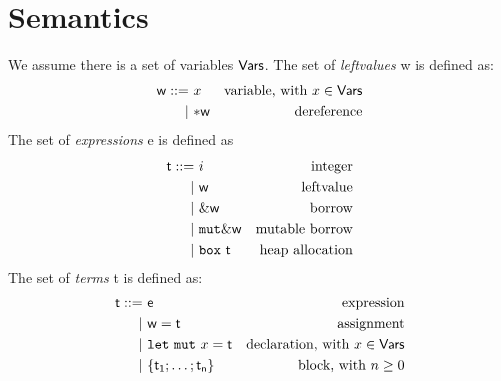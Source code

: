 \section{Semantics}\label{sec:semantics}

\begin{definition}
  We assume there is a set of variables $\mathsf{Vars}$.
  The set of \emph{leftvalues} \textsf{w} is defined as:
  \begin{align*}
    \mathsf{w} ::= &\ x & \text{variable, with $x\in\mathsf{Vars}$}\\
    | &\ \mathtt{*}\mathsf{w} & \text{dereference}
  \end{align*}
  The set of \emph{expressions} \textsf{e} is defined as
  \begin{align*}
    \mathsf{t} ::= &\ i & \text{integer}\\
    | &\ \mathsf{w} & \text{leftvalue}\\
    | &\ \&\mathsf{w} & \text{borrow}\\
    | &\ \mathtt{mut}\&\mathsf{w} & \text{mutable borrow}\\
    | &\ \mathtt{box}\ \mathsf{t} & \text{heap allocation}
  \end{align*}
  The set of \emph{terms} \textsf{t} is defined as:
  \begin{align*}
    \mathsf{t} ::= &\ \mathsf{e} & \text{expression}\\
    | &\ \mathsf{w}=\mathsf{t} & \text{assignment}\\
    | &\ \mathtt{let\ mut}\ x=\mathsf{t} & \text{declaration, with $x\in\mathsf{Vars}$}\\
    | &\ \{\mathsf{t_1};\ldots;\mathsf{t_n}\} & \text{block, with $n\ge 0$}
  \end{align*}
\end{definition}

